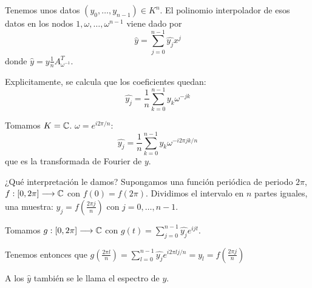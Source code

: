 Tenemos unos datos \((y_0,\ldots, y_{n-1})\in K^n\). El polinomio
interpolador de esos datos en los nodos \(1,\omega,\ldots,\omega^{n-1}\)
viene dado por
\[
  \hat{y} =\sum_{j=0}^{n-1}\hat{y_j}x^j
\]
donde \(\hat{y}=y\frac{1}{n}A^T_{\omega^{-1}}\).

Explicitamente, se calcula que los coeficientes quedan:
\[
  \hat{y_j}=\frac{1}{n}\sum_{k=0}^{n-1}y_k\omega^{-jk}
\]

Tomamos \(K=\mathbb{C}\). \(\omega = e^{i2\pi/n}\):
\[
  \hat{y_j}=\frac{1}{n}\sum_{k=0}^{n-1}y_k\omega^{-i2\pi jk/n}
\]
que es la transformada de Fourier de \(y\).

¿Qué interpretación le damos? Supongamos una función periódica de periodo
\(2\pi\), \(f:[0,2\pi]\longrightarrow\mathbb{C}\) con \(f(0)=f(2\pi)\).
Dividimos el intervalo en \(n\) partes iguales, una muestra:
\(y_j=f(\frac{2\pi j}{n})\) con \(j=0,\ldots,n-1\).

Tomamos \(g:[0,2\pi]\longrightarrow\mathbb{C}\) con
\(g(t)=\sum_{j=0}^{n-1}\hat{y_j}e^{ijt}\).

Tenemos entonces que \(g(\frac{2\pi l}{n})=
\sum_{l=0}^{n-1}\hat{y_j}e^{i2\pi lj/n} = y_l=f(\frac{2\pi j}{n})\)

A los \(\hat{y}\) también se le llama el espectro de \(y\).
